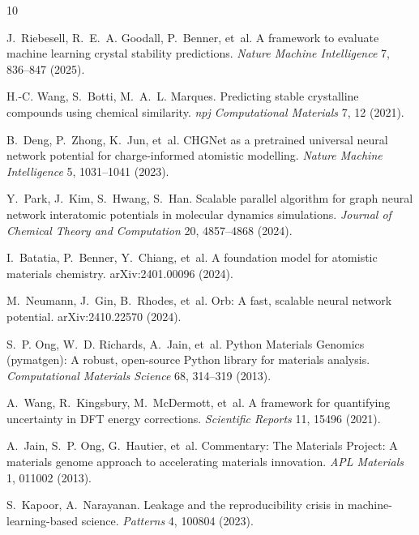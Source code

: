 \documentclass[11pt]{article}
\begin{document}
\begin{thebibliography}{10}
\small

J.~Riebesell, R.~E.~A. Goodall, P.~Benner, et~al.
\newblock A framework to evaluate machine learning crystal stability
predictions.
\newblock \emph{Nature Machine Intelligence} 7, 836--847 (2025).

H.-C. Wang, S.~Botti, M.~A.~L. Marques.
\newblock Predicting stable crystalline compounds using chemical similarity.
\newblock \emph{npj Computational Materials} 7, 12 (2021).

B.~Deng, P.~Zhong, K.~Jun, et~al.
\newblock CHGNet as a pretrained universal neural network potential for
charge-informed atomistic modelling.
\newblock \emph{Nature Machine Intelligence} 5, 1031--1041 (2023).

Y.~Park, J.~Kim, S.~Hwang, S.~Han.
\newblock Scalable parallel algorithm for graph neural network interatomic
potentials in molecular dynamics simulations.
\newblock \emph{Journal of Chemical Theory and Computation} 20, 4857--4868
(2024).

I.~Batatia, P.~Benner, Y.~Chiang, et~al.
\newblock A foundation model for atomistic materials chemistry.
\newblock arXiv:2401.00096 (2024).

M.~Neumann, J.~Gin, B.~Rhodes, et~al.
\newblock Orb: A fast, scalable neural network potential.
\newblock arXiv:2410.22570 (2024).

S.~P. Ong, W.~D. Richards, A.~Jain, et~al.
\newblock Python Materials Genomics (pymatgen): A robust, open-source Python
library for materials analysis.
\newblock \emph{Computational Materials Science} 68, 314--319 (2013).

A.~Wang, R.~Kingsbury, M.~McDermott, et~al.
\newblock A framework for quantifying uncertainty in DFT energy corrections.
\newblock \emph{Scientific Reports} 11, 15496 (2021).

A.~Jain, S.~P. Ong, G.~Hautier, et~al.
\newblock Commentary: The Materials Project: A materials genome approach to
accelerating materials innovation.
\newblock \emph{APL Materials} 1, 011002 (2013).

S.~Kapoor, A.~Narayanan.
\newblock Leakage and the reproducibility crisis in machine-learning-based
science.
\newblock \emph{Patterns} 4, 100804 (2023).

\end{thebibliography}
\end{document}
